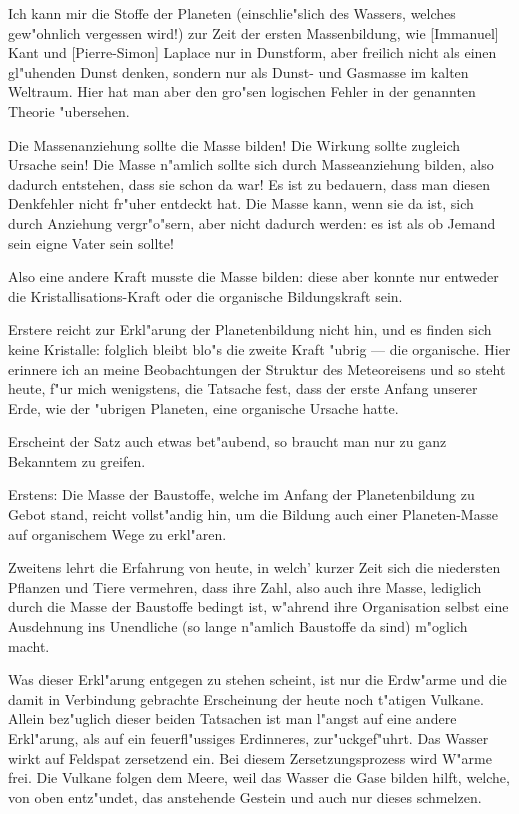 \documentclass[a4paper, 11pt, oneside]{article}
\begin{document}
Ich kann mir die Stoffe der Planeten (einschlie"slich des Wassers, welches gew"ohnlich vergessen wird!) zur Zeit der ersten Massenbildung, wie [Immanuel] Kant und [Pierre-Simon] Laplace nur in Dunstform, aber freilich nicht als einen gl"uhenden Dunst denken, sondern nur als Dunst- und Gasmasse im kalten Weltraum. Hier hat man aber den gro"sen logischen Fehler in der genannten Theorie "ubersehen.

Die Massenanziehung sollte die Masse bilden! Die Wirkung sollte zugleich Ursache sein! Die Masse n"amlich sollte sich durch Masseanziehung bilden, also dadurch entstehen, dass sie schon da war! Es ist zu bedauern, dass man diesen Denkfehler nicht fr"uher entdeckt hat. Die Masse kann, wenn sie da ist, sich durch Anziehung vergr"o"sern, aber nicht dadurch werden: es ist als ob Jemand sein eigne Vater sein sollte!

Also eine andere Kraft musste die Masse bilden: diese aber konnte nur entweder die Kristallisations-Kraft oder die organische Bildungskraft sein.

Erstere reicht zur Erkl"arung der Planetenbildung nicht hin, und es finden sich keine Kristalle: folglich bleibt blo"s die zweite Kraft "ubrig --- die organische. Hier erinnere ich an meine Beobachtungen der Struktur des Meteoreisens und so steht heute, f"ur mich wenigstens, die Tatsache fest, dass der erste Anfang unserer Erde, wie der "ubrigen Planeten, eine organische Ursache hatte.

Erscheint der Satz auch etwas bet"aubend, so braucht man nur zu ganz Bekanntem zu greifen.

Erstens: Die Masse der Baustoffe, welche im Anfang der Planetenbildung zu Gebot stand, reicht vollst"andig hin, um die Bildung auch einer Planeten-Masse auf organischem Wege zu erkl"aren.

Zweitens lehrt die Erfahrung von heute, in welch' kurzer Zeit sich die niedersten Pflanzen und Tiere vermehren, dass ihre Zahl, also auch ihre Masse, lediglich durch die Masse der Baustoffe bedingt ist, w"ahrend ihre Organisation selbst eine Ausdehnung ins Unendliche (so lange n"amlich Baustoffe da sind) m"oglich macht.

Was dieser Erkl"arung entgegen zu stehen scheint, ist nur die Erdw"arme und die damit in Verbindung gebrachte Erscheinung der heute noch t"atigen Vulkane. Allein bez"uglich dieser beiden Tatsachen ist man l"angst auf eine andere Erkl"arung, als auf ein feuerfl"ussiges Erdinneres, zur"uckgef"uhrt. Das Wasser wirkt auf Feldspat zersetzend ein. Bei diesem Zersetzungsprozess wird W"arme frei. Die Vulkane folgen dem Meere, weil das Wasser die Gase bilden hilft, welche, von oben entz"undet, das anstehende Gestein und auch nur dieses schmelzen.
\end{document}
